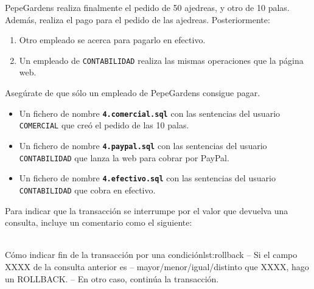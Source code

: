 \newpage

\begin{homeworkProblem}
  PepeGardens realiza finalmente el pedido de 50 ajedreas, y otro de 10 palas. Además, realiza el pago para el pedido de las ajedreas. Posteriormente:

  {

    \begin{enumerate}
    \item Otro empleado se acerca para pagarlo en efectivo.
    \item Un empleado de \texttt{CONTABILIDAD} realiza las mismas operaciones que la página web.
    \end{enumerate}
  }
  Asegúrate de que sólo un empleado de PepeGardens consigue pagar.
  \begin{Aviso}
    \begin{itemize}
    \item Un fichero de nombre \texttt{\textbf{4.comercial.sql}} con las sentencias del usuario \texttt{COMERCIAL} que creó el pedido de las 10 palas.
    \item Un fichero de nombre \texttt{\textbf{4.paypal.sql}}  con las sentencias del usuario \texttt{CONTABILIDAD} que lanza la web para cobrar por PayPal.
    \item Un fichero de nombre \texttt{\textbf{4.efectivo.sql}}  con las sentencias del usuario \texttt{CONTABILIDAD} que cobra en efectivo.
    \end{itemize}

    Para indicar que la transacción se interrumpe por el valor que devuelva una consulta, incluye un comentario como el siguiente:
    \\
    \\
\begin{listadosql}{Cómo indicar fin de la transacción por una condición}{lst:rollback}
-- Si el campo XXXX de la consulta anterior es
-- mayor/menor/igual/distinto que XXXX, hago un ROLLBACK.
-- En otro caso, continúa la transacción.
\end{listadosql}
    

  \end{Aviso}

\end{homeworkProblem}

